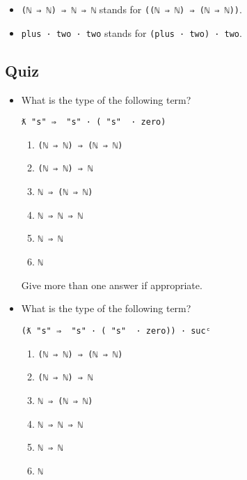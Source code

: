 \begin{itemize}
\tightlist
\item
  \texttt{(\textasciigrave{}ℕ\ ⇒\ \textasciigrave{}ℕ)\ ⇒\ \textasciigrave{}ℕ\ ⇒\ \textasciigrave{}ℕ}
  stands for
  \texttt{((\textasciigrave{}ℕ\ ⇒\ \textasciigrave{}ℕ)\ ⇒\ (\textasciigrave{}ℕ\ ⇒\ \textasciigrave{}ℕ))}.
\item
  \texttt{plus\ ·\ two\ ·\ two} stands for
  \texttt{(plus\ ·\ two)\ ·\ two}.
\end{itemize}

\hypertarget{quiz-2}{%
\subsection{Quiz}\label{quiz-2}}

\begin{itemize}
\item
  What is the type of the following term?

  \texttt{ƛ\ "s"\ ⇒\ \textasciigrave{}\ "s"\ ·\ (\textasciigrave{}\ "s"\ \ ·\ \textasciigrave{}zero)}

  \begin{enumerate}
  \def\labelenumi{\arabic{enumi}.}
  \tightlist
  \item
    \texttt{(\textasciigrave{}ℕ\ ⇒\ \textasciigrave{}ℕ)\ ⇒\ (\textasciigrave{}ℕ\ ⇒\ \textasciigrave{}ℕ)}
  \item
    \texttt{(\textasciigrave{}ℕ\ ⇒\ \textasciigrave{}ℕ)\ ⇒\ \textasciigrave{}ℕ}
  \item
    \texttt{\textasciigrave{}ℕ\ ⇒\ (\textasciigrave{}ℕ\ ⇒\ \textasciigrave{}ℕ)}
  \item
    \texttt{\textasciigrave{}ℕ\ ⇒\ \textasciigrave{}ℕ\ ⇒\ \textasciigrave{}ℕ}
  \item
    \texttt{\textasciigrave{}ℕ\ ⇒\ \textasciigrave{}ℕ}
  \item
    \texttt{\textasciigrave{}ℕ}
  \end{enumerate}

  Give more than one answer if appropriate.
\item
  What is the type of the following term?

  \texttt{(ƛ\ "s"\ ⇒\ \textasciigrave{}\ "s"\ ·\ (\textasciigrave{}\ "s"\ \ ·\ \textasciigrave{}zero))\ ·\ sucᶜ}

  \begin{enumerate}
  \def\labelenumi{\arabic{enumi}.}
  \tightlist
  \item
    \texttt{(\textasciigrave{}ℕ\ ⇒\ \textasciigrave{}ℕ)\ ⇒\ (\textasciigrave{}ℕ\ ⇒\ \textasciigrave{}ℕ)}
  \item
    \texttt{(\textasciigrave{}ℕ\ ⇒\ \textasciigrave{}ℕ)\ ⇒\ \textasciigrave{}ℕ}
  \item
    \texttt{\textasciigrave{}ℕ\ ⇒\ (\textasciigrave{}ℕ\ ⇒\ \textasciigrave{}ℕ)}
  \item
    \texttt{\textasciigrave{}ℕ\ ⇒\ \textasciigrave{}ℕ\ ⇒\ \textasciigrave{}ℕ}
  \item
    \texttt{\textasciigrave{}ℕ\ ⇒\ \textasciigrave{}ℕ}
  \item
    \texttt{\textasciigrave{}ℕ}
  \end{enumerate}


\end{itemize}
